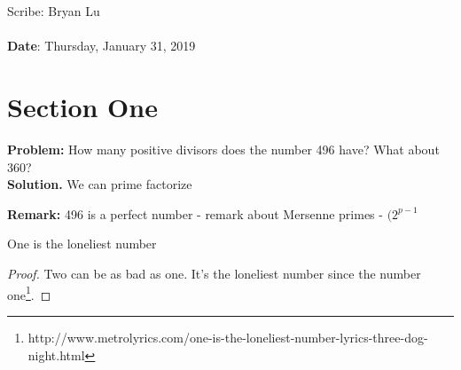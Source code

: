 \documentclass[11pt,twosided]{article}
\def\titlestring{ }
\def\scribestring{Bryan Lu}
\def\datestring{Thursday, January 31, 2019}
\begin{document}
\thispagestyle{plain}  %

\noindent
{\LARGE \textbf{\titlestring}}\\\\
%
{\Large Scribe: \scribestring}\\ \\
{\textbf{Date}: \datestring}


\noindent

\section{Section One}
\textbf{Problem: } How many positive divisors does the number 496 have? What about 360? \\
\textbf{Solution. } We can prime factorize 

\textbf{Remark: } 496 is a perfect number - remark about Mersenne primes - $(2^{p-1}$
\begin{theorem}
	One is the loneliest number
\end{theorem}
\begin{proof}
	Two can be as bad as one. It's the loneliest number since the number one\footnote{http://www.metrolyrics.com/one-is-the-loneliest-number-lyrics-three-dog-night.html}.
\end{proof}
\end{document}
